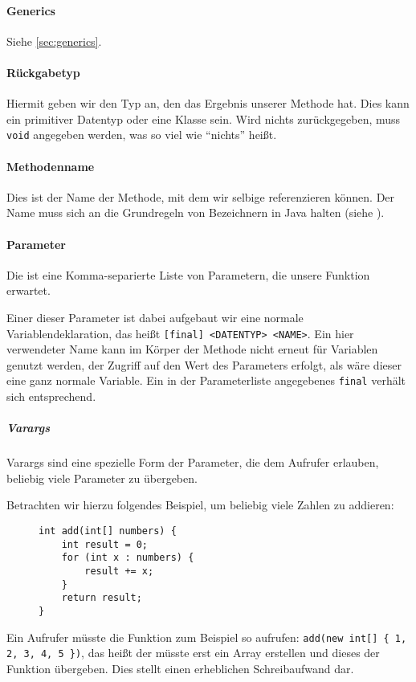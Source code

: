 	\paragraph{Generics}
		Siehe \ref{sec:generics}.
	
	\paragraph{Rückgabetyp}
		Hiermit geben wir den Typ an, den das Ergebnis unserer Methode hat. Dies kann ein primitiver Datentyp oder eine Klasse sein. Wird nichts zurückgegeben, muss \texttt{void} angegeben werden, was so viel wie \enquote{nichts} heißt.
	
	\paragraph{Methodenname}
		Dies ist der Name der Methode, mit dem wir selbige referenzieren können. Der Name muss sich an die Grundregeln von Bezeichnern in Java halten (siehe ).
	
	\paragraph{Parameter}
		Die ist eine Komma-separierte Liste von Parametern, die unsere Funktion erwartet.
		
		Einer dieser Parameter ist dabei aufgebaut wir eine normale Variablendeklaration, das heißt \texttt{[final] <DATENTYP> <NAME>}. Ein hier verwendeter Name kann im Körper der Methode nicht erneut für Variablen genutzt werden, der Zugriff auf den Wert des Parameters erfolgt, als wäre dieser eine ganz normale Variable. Ein in der Parameterliste angegebenes \texttt{final} verhält sich entsprechend.
		
		\subparagraph{Varargs}
			Varargs sind eine spezielle Form der Parameter, die dem Aufrufer erlauben, beliebig viele Parameter zu übergeben.
			
			Betrachten wir hierzu folgendes Beispiel, um beliebig viele Zahlen zu addieren:
			\begin{figure}[H]
				\centering
				\begin{lstlisting}
int add(int[] numbers) {
	int result = 0;
	for (int x : numbers) {
		result += x;
	}
	return result;
}
				\end{lstlisting}
			\end{figure}
			Ein Aufrufer müsste die Funktion zum Beispiel so aufrufen: \lstinline|add(new int[] { 1, 2, 3, 4, 5 })|, das heißt der müsste erst ein Array erstellen und dieses der Funktion übergeben. Dies stellt einen erheblichen Schreibaufwand dar.
			
